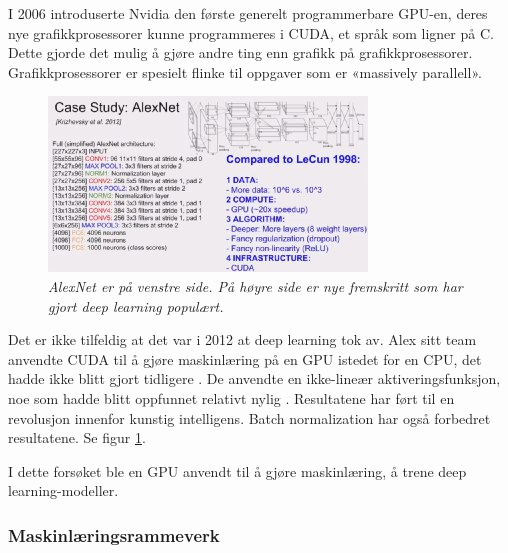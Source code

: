 I 2006 introduserte Nvidia den første generelt programmerbare GPU-en, deres nye grafikkprosessorer kunne programmeres i CUDA, et språk som ligner på C. Dette gjorde det mulig å gjøre andre ting enn grafikk på grafikkprosessorer. Grafikkprosessorer er spesielt flinke til oppgaver som er «massively parallell». \cite{Buck 2006 s. 1} %

\begin{figure}[t]
\begin{center} 
\includegraphics[scale=1.0]{figures/comparison}
\caption{\small \sl AlexNet er på venstre side. På høyre side er nye fremskritt som har gjort deep learning populært. \cite{Karpathy 2014} \label{fig:comparison}}
\end{center} 
\end{figure} 

Det er ikke tilfeldig at det var i 2012 at deep learning tok av. Alex sitt team anvendte CUDA til å gjøre maskinlæring på en GPU istedet for en CPU, det hadde ikke blitt gjort tidligere \cite{Krizhevsky m.fl. 2012}. De anvendte en ikke-lineær aktiveringsfunksjon, noe som hadde blitt oppfunnet relativt nylig \cite{LeCun m.fl. 1998 s. 3}. Resultatene har ført til en revolusjon innenfor kunstig intelligens. Batch normalization har også forbedret resultatene. Se figur \ref{fig:comparison}. \cite{Ioffe og Szegedy 2015 s. 1}

I dette forsøket ble en GPU anvendt til å gjøre maskinlæring, å trene deep learning-modeller.

\subsubsection{Maskinlæringsrammeverk}

